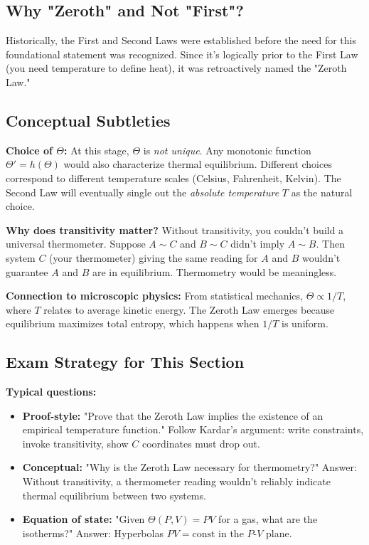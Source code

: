 \documentclass[9pt,twocoloumn]{article}
\begin{document}
\subsection{Why "Zeroth" and Not "First"?}
Historically, the First and Second Laws were established before the need for this foundational statement was recognized. Since it's logically prior to the First Law (you need temperature to define heat), it was retroactively named the "Zeroth Law."

\subsection{Conceptual Subtleties}

\textbf{Choice of $\Theta$:}
At this stage, $\Theta$ is \emph{not unique}. Any monotonic function $\Theta' = h(\Theta)$ would also characterize thermal equilibrium. Different choices correspond to different temperature scales (Celsius, Fahrenheit, Kelvin). The Second Law will eventually single out the \emph{absolute temperature} $T$ as the natural choice.

\textbf{Why does transitivity matter?}
Without transitivity, you couldn't build a universal thermometer. Suppose $A \sim C$ and $B \sim C$ didn't imply $A \sim B$. Then system $C$ (your thermometer) giving the same reading for $A$ and $B$ wouldn't guarantee $A$ and $B$ are in equilibrium. Thermometry would be meaningless.

\textbf{Connection to microscopic physics:}
From statistical mechanics, $\Theta \propto 1/T$, where $T$ relates to average kinetic energy. The Zeroth Law emerges because equilibrium maximizes total entropy, which happens when $1/T$ is uniform.

\subsection{Exam Strategy for This Section}

\textbf{Typical questions:}
\begin{itemize}
    \item \textbf{Proof-style:} "Prove that the Zeroth Law implies the existence of an empirical temperature function." Follow Kardar's argument: write constraints, invoke transitivity, show $C$ coordinates must drop out.
    \item \textbf{Conceptual:} "Why is the Zeroth Law necessary for thermometry?" Answer: Without transitivity, a thermometer reading wouldn't reliably indicate thermal equilibrium between two systems.
    \item \textbf{Equation of state:} "Given $\Theta(P, V) = PV$ for a gas, what are the isotherms?" Answer: Hyperbolas $PV = \text{const}$ in the $P$-$V$ plane.
\end{itemize}
\end{document}
